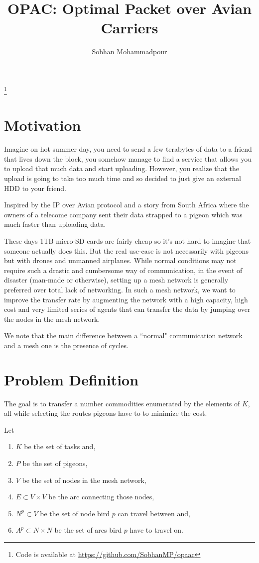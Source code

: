 \documentclass{article}
\author{Sobhan Mohammadpour}
\title{OPAC: Optimal Packet over Avian Carriers}
\newcommand\blfootnote[1]{%
	\begingroup
	\renewcommand\thefootnote{}\footnote{#1}%
	\addtocounter{footnote}{-1}%
	\endgroup
}
\begin{document}
	\maketitle
	\blfootnote{Code is available at \url{https://github.com/SobhanMP/opaac}}
	\section{Motivation}
	
	Imagine on hot summer day, you need to send a few terabytes of data to a friend that lives down the block, you somehow manage to find a service that allows you to upload that much data and start uploading. However, you realize that the upload is going to take too much time and so decided to just give an external HDD to your friend.
	
	
	Inspired by the IP over Avian protocol  and a story from South Africa \autocite{abellAfricaPigeonTransfers} where the owners of a telecome company sent their data strapped to a pigeon which was much faster than uploading data. 
	
	These days 1TB micro-SD cards are fairly cheap so it's not hard to imagine that someone actually does this. But the real use-case is not necessarily with pigeons but with drones and unmanned airplanes. While normal conditions may not require such a drastic and cumbersome way of communication, in the event of disaster (man-made or otherwise), setting up a mesh network is generally preferred over total lack of networking. In such a mesh network, we want to improve the transfer rate by augmenting the network with a high capacity, high cost and very limited series of agents that can transfer the data by jumping over the nodes in the mesh network.
	
	We note that the main difference between a ``normal" communication network and a mesh one is the presence of cycles.
	
	\section{Problem Definition}
	The goal is to transfer a number commodities enumerated by the elements of $K$, all while selecting the routes pigeons have to to minimize the cost.
	
	
	Let
	\begin{enumerate}
			\item $K$ be the set of tasks and,
		\item $P$ be the set of pigeons,
		\item $V$ be the set of nodes in the mesh network,
		\item $E \subset V \times V$ be the arc connecting those nodes,
		\item $N^p \subset V$ be the set of node bird $p$ can travel between and,
		\item $A^p \subset N\times N$ be the set of arcs bird $p$ have to travel on.
	\end{enumerate}
\end{document}
